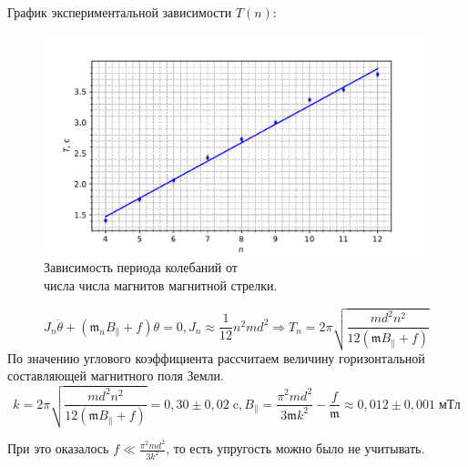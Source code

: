 \documentclass[a4paper,12pt]{article}
\begin{document}
График экспериментальной зависимости $T(n)$:
\begin{figure}[h]
  \centering
  \includegraphics{graph.pdf}
  \caption{Зависимость периода колебаний от \\ числа числа магнитов магнитной стрелки.}
\end{figure}

 \[J_n \ddot\theta + (\mathfrak{m}_n B_{\|}+f)\theta = 0, J_n \approx \frac1{12}n^2md^2 \Rightarrow T_n = 2\pi \sqrt{ \frac{md^2n^2}{12(\mathfrak{m}B_{\|}+f)}}\]
По значению углового коэффициента рассчитаем величину горизонтальной составляющей магнитного поля Земли.
$$k = 2\pi \sqrt{ \frac{md^2n^2}{12(\mathfrak{m}B_{\|}+f)}} = 0,30 \pm 0,02 \; \text{c}, B_{\|} = \frac{\pi^2md^2}{3\mathfrak{m}k^2} - \frac{f}{\mathfrak{m}} \approx 0,012 \pm 0,001 \; \text{мТл} $$

При это оказалось $f \ll \frac{\pi^2md^2}{3k^2}$, то есть упругость можно было не учитывать.\\
\end{document}
